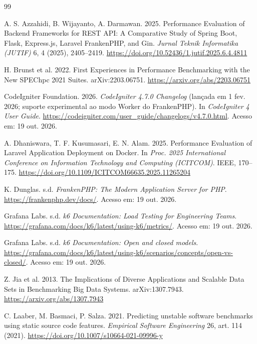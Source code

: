 
\begin{thebibliography}{99}

A. S. Azzahidi, B. Wijayanto, A. Darmawan. 2025. Performance Evaluation of Backend Frameworks for REST API: A Comparative Study of Spring Boot, Flask, Express.js, Laravel FrankenPHP, and Gin. \textit{Jurnal Teknik Informatika (JUTIF)} 6, 4 (2025), 2405--2419. \url{https://doi.org/10.52436/1.jutif.2025.6.4.4811}

H. Brunst et al. 2022. First Experiences in Performance Benchmarking with the New SPEChpc 2021 Suites. arXiv:2203.06751. \url{https://arxiv.org/abs/2203.06751}

CodeIgniter Foundation. 2026. \textit{CodeIgniter 4.7.0 Changelog} (lançada em 1 fev. 2026; suporte experimental ao modo Worker do FrankenPHP). In \textit{CodeIgniter 4 User Guide}. \url{https://codeigniter.com/user_guide/changelogs/v4.7.0.html}. Acesso em: 19 out. 2026.

A. Dhaniswara, T. F. Kusumasari, E. N. Alam. 2025. Performance Evaluation of Laravel Application Deployment on Docker. In \textit{Proc. 2025 International Conference on Information Technology and Computing (ICITCOM)}. IEEE, 170--175. \url{https://doi.org/10.1109/ICITCOM66635.2025.11265204}

K. Dunglas. s.d. \textit{FrankenPHP: The Modern Application Server for PHP}. \url{https://frankenphp.dev/docs/}. Acesso em: 19 out. 2026.

Grafana Labs. s.d. \textit{k6 Documentation: Load Testing for Engineering Teams}. \url{https://grafana.com/docs/k6/latest/using-k6/metrics/}. Acesso em: 19 out. 2026.

Grafana Labs. s.d. \textit{k6 Documentation: Open and closed models}. \url{https://grafana.com/docs/k6/latest/using-k6/scenarios/concepts/open-vs-closed/}. Acesso em: 19 out. 2026.

Z. Jia et al. 2013. The Implications of Diverse Applications and Scalable Data Sets in Benchmarking Big Data Systems. arXiv:1307.7943. \url{https://arxiv.org/abs/1307.7943}

C. Laaber, M. Basmaci, P. Salza. 2021. Predicting unstable software benchmarks using static source code features. \textit{Empirical Software Engineering} 26, art. 114 (2021). \url{https://doi.org/10.1007/s10664-021-09996-y}


\end{thebibliography}
